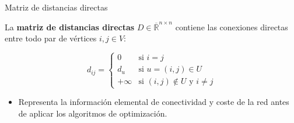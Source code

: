 \documentclass[
  ignorenonframetext,
]{beamer}
\providecommand{\tightlist}{%
  \setlength{\itemsep}{0pt}\setlength{\parskip}{0pt}}
\begin{document}
\begin{frame}{Matriz de distancias directas}
\label{matriz-de-distancias-directas}
\begin{tcolorbox}[enhanced jigsaw, colframe=quarto-callout-note-color-frame, toptitle=1mm, colback=white, colbacktitle=quarto-callout-note-color!10!white, titlerule=0mm, breakable, coltitle=black, opacityback=0, bottomrule=.15mm, title=\textcolor{quarto-callout-note-color}{\faInfo}\hspace{0.5em}{Matriz de distancias directas}, rightrule=.15mm, arc=.35mm, leftrule=.75mm, left=2mm, toprule=.15mm, bottomtitle=1mm, opacitybacktitle=0.6]

La \textbf{matriz de distancias directas}
\(D \in \overline{\mathbb{R}}^{n \times n}\) contiene las conexiones
directas entre todo par de vértices \(i, j \in V\):

\[
d_{ij} = \begin{cases} 
0 & \text{si } i = j \\ 
d_u & \text{si } u = (i, j) \in U \\ 
+\infty & \text{si } (i, j) \notin U \text{ y } i \neq j 
\end{cases}
\]

\end{tcolorbox}

\begin{itemize}
\tightlist
\item
  Representa la información elemental de conectividad y coste de la red
  antes de aplicar los algoritmos de optimización.
\end{itemize}
\end{frame}
\end{document}
